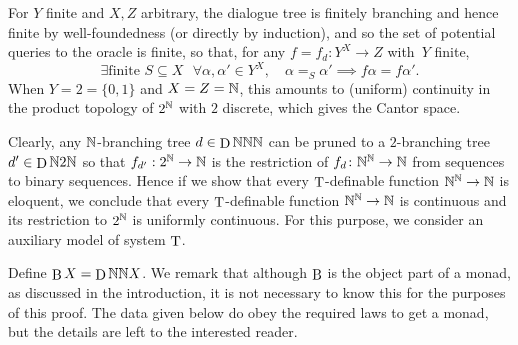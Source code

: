 \documentclass{entcs} \usepackage{prentcsmacro}
\begin{document}
For $Y$ finite and $X,Z$ arbitrary, the dialogue tree is finitely
branching and hence finite by well-foundedness (or directly by
induction), and so the set of potential queries to the oracle is
finite, so that, for any $f = f_d \colon Y^X \to Z$ with~$Y$ finite,
\[
\exists \text{finite $S \subseteq X$ } \forall \alpha,\alpha' \in Y^X, \quad
\alpha =_S \alpha' \implies f\alpha =f \alpha'.
\]
When $Y=2=\{0,1\}$ and $X=Z=\mathbb{N}$, this amounts to
(uniform) continuity in the product topology of $2^{\mathbb{N}}$ with $2$ discrete,
which gives the Cantor space.

Clearly, any $\mathbb{N}$-branching tree $d \in \mathop{\mathrm{D}}\nolimits \mathbb{N} \mathbb{N} \mathbb{N}$ can be pruned to
a $2$-branching tree $d' \in \mathop{\mathrm{D}}\nolimits \mathbb{N} 2 \mathbb{N}$ so that $f_{d'} : 2^{\mathbb{N}} \to
\mathbb{N}$ is the restriction of $f_d \colon \mathbb{N}^{\mathbb{N}} \to \mathbb{N}$ from sequences to
binary sequences.  Hence if we show that every $\mathop{\mathrm{T}}\nolimits$-definable function
$\mathbb{N}^{\mathbb{N}} \to \mathbb{N}$ is eloquent, we conclude that every $\mathop{\mathrm{T}}\nolimits$-definable
function $\mathbb{N}^{\mathbb{N}} \to \mathbb{N}$ is continuous and its restriction to $2^{\mathbb{N}}$ is
uniformly continuous. For this purpose, we consider an auxiliary
model of system $\mathop{\mathrm{T}}\nolimits$.

Define $\mathop{\mathrm{B}}\nolimits X = \mathop{\mathrm{D}}\nolimits \mathbb{N} \mathbb{N} X$. We remark that although $\mathop{\mathrm{B}}\nolimits$ is the object
part of a monad, as discussed in the introduction, it is not necessary
to know this for the purposes of this proof. The data given below do
obey the required laws to get a monad, but the details are left to the
interested reader.
\end{document}
